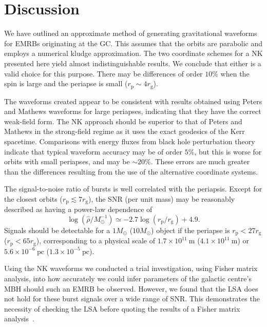 \documentclass[useAMS,usedcolumn,usegraphicx,usenatbib]{mn2e}
\newcommand{\units}[1]{\ensuremath{~\mathrm{#1}}}
\newcommand{\sub}[1]{\ensuremath{_\mathrm{#1}}}
\begin{document}
\section{Discussion}\label{sec:End}

We have outlined an approximate method of generating gravitational waveforms for EMRBs originating at the GC. This assumes that the orbits are parabolic and employs a numerical kludge approximation. The two coordinate schemes for a NK presented here yield almost indistinguishable results. We conclude that either is a valid choice for this purpose. There may be differences of order $10\%$ when the spin is large and the periapse is small ($r\sub{p} \sim 4 r\sub{g}$).

The waveforms created appear to be consistent with results obtained using Peters and Mathews waveforms for large periapses, indicating that they have the correct weak-field form. The NK approach should be superior to that of Peters and Mathews in the strong-field regime as it uses the exact geodesics of the Kerr spacetime. Comparisons with energy fluxes from black hole perturbation theory indicate that typical waveform accuracy may be of order $5\%$, but this is worse for orbits with small periapses, and may be $\sim 20\%$. These errors are much greater than the differences resulting from the use of the alternative coordinate systems.

The signal-to-noise ratio of bursts is well correlated with the periapsis. Except for the closest orbits ($r\sub{p} \lesssim 7 r\sub{g}$), the SNR (per unit mass) may be reasonably described as having a power-law dependence of
\begin{equation}
\log\left(\hat{\rho}/M_\odot^{-1}\right) \simeq -2.7\log(r\sub{p}/r\sub{g}) + 4.9.
\end{equation}
Signals should be detectable for a $1 M_\odot$ ($10 M_\odot$) object if the periapse is $r\sub{p} < 27 r\sub{g}$ ($r\sub{p} < 65 r\sub{g}$), corresponding to a physical scale of $1.7 \times 10^{11}\units{m}$ ($4.1 \times 10^{11}\units{m}$) or $5.6 \times 10^{-6}\units{pc}$ ($1.3 \times 10^{-5}\units{pc}$).

Using the NK waveforms we conducted a trial investigation, using Fisher matrix analysis, into how accurately we could infer parameters of the galactic centre's MBH should such an EMRB be observed. However, we found that the LSA does not hold for these burst signals over a wide range of SNR. This demonstrates the necessity of checking the LSA before quoting the results of a Fisher matrix analysis~\citep{Vallisneri2008}.
\end{document}
